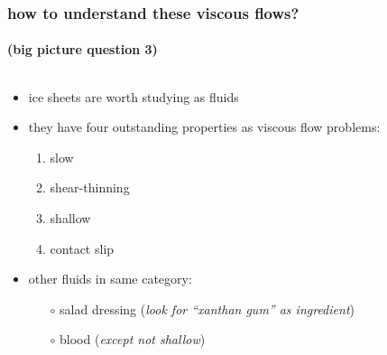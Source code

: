 \documentclass[10pt,hyperref={pdfpagelabels=true}]{beamer}
\begin{document}
\begin{frame}
  \frametitle{how to understand these viscous flows?}
  \framesubtitle{(big picture question 3)}

\begin{columns}
\begin{column}{0.6\textwidth}
\begin{itemize}
\item ice sheets are worth studying as fluids
\item they have four outstanding properties as viscous flow problems:
  \begin{enumerate}
  \item \alert{slow}
  \item \alert{shear-thinning}
  \item \alert{shallow}
  \item \alert{contact slip}
  \end{enumerate}
\item other fluids in same category:
  \begin{itemize}
  \item[$\circ$] salad dressing (\emph{look for ``xanthan gum'' as ingredient})
  \item[$\circ$] blood (\emph{except not shallow})
  \end{itemize}
\end{itemize}
\end{column}
\begin{column}{0.4\textwidth}


\end{column}
\end{columns}
\end{frame}
\end{document}
